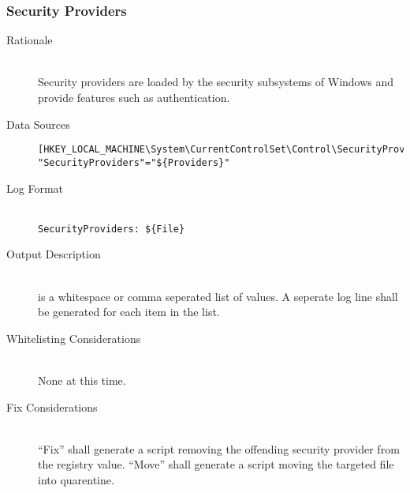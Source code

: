 \subsubsection{Security Providers}
\begin{description}
\item[Rationale] \hfill \\
Security providers are loaded by the security subsystems of Windows and provide
features such as authentication.
\item[Data Sources] \hfill
\vspace{-\baselineskip}
\begin{verbatim}
[HKEY_LOCAL_MACHINE\System\CurrentControlSet\Control\SecurityProviders]
"SecurityProviders"="${Providers}"
\end{verbatim}
\item[Log Format] \hfill \\
\verb|SecurityProviders: ${File}|
\item[Output Description] \hfill \\
 is a whitespace or comma seperated list of values. A seperate
log line shall be generated for each item in the list.
\item[Whitelisting Considerations] \hfill \\
None at this time.
\item[Fix Considerations] \hfill \\
``Fix'' shall generate a script removing the offending security provider from
the registry value. ``Move'' shall generate a script moving the targeted file
into quarentine.
\end{description}

